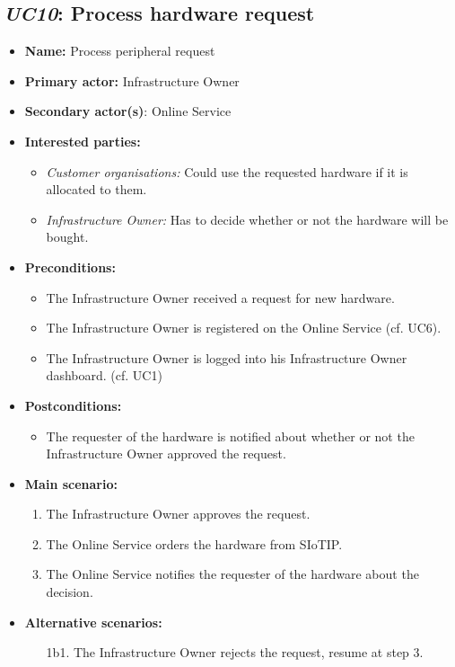 \documentclass[english]{sareport}
\begin{document}
\subsection{\emph{UC10}: Process hardware request}
\begin{itemize}
    \item \textbf{Name:} Process peripheral request
    \item \textbf{Primary actor:} Infrastructure Owner
    \item \textbf{Secondary actor(s)}: Online Service
    \item \textbf{Interested parties:} 
        \begin{itemize}
            \item \textit{Customer organisations:} Could use the requested hardware if it is allocated to them.
            \item \textit{Infrastructure Owner:} Has to decide whether or not the hardware will be bought.
        \end{itemize}

    \item \textbf{Preconditions:}
        \begin{itemize}
            \item The Infrastructure Owner received a request for new hardware.
            \item The Infrastructure Owner is registered on the Online Service (cf. UC6).
            \item The Infrastructure Owner is logged into his Infrastructure Owner dashboard. (cf. UC1)
        \end{itemize}

    \item \textbf{Postconditions:}
        \begin{itemize}
            \item The requester of the hardware is notified about whether or not the Infrastructure Owner approved the request.
        \end{itemize}
        
    \item \textbf{Main scenario:} 
    \begin{enumerate}
       \item The Infrastructure Owner approves the request.
       \item The Online Service orders the hardware from SIoTIP.
       \item The Online Service notifies the requester of the hardware about the decision.
    \end{enumerate}

    \item \textbf{Alternative scenarios:} 
    \begin{enumerate}
        \item [1b1.] The Infrastructure Owner rejects the request, resume at step 3.
    \end{enumerate}
\end{itemize}
\end{document}
